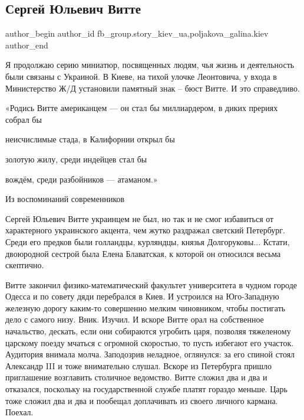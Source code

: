  
 
 
 
 
 
\subsection{Сергей Юльевич Витте}
\label{sec:22_12_2021.fb.fb_group.story_kiev_ua.3.vitte}
 
\ifcmt
 author_begin
   author_id fb_group.story_kiev_ua,poljakova_galina.kiev
 author_end
\fi

Я продолжаю серию миниатюр, посвященных людям, чья жизнь и деятельность были
связаны с Украиной. В Киеве, на тихой улочке Леонтовича, у входа в Министерство
Ж/Д установили памятный знак – бюст Витте. И это справедливо. 

\begin{zznagolos}
«Родись Витте американцем — он стал бы миллиардером, в диких прериях собрал бы 

неисчислимые стада, в Калифорнии открыл бы

золотую жилу, среди индейцев стал бы

вождём, среди разбойников — атаманом.»

Из воспоминаний современников
\end{zznagolos}

Сергей Юльевич Витте украинцем не был, но так и не смог избавиться от
характерного украинского акцента, чем жутко раздражал светский Петербург. Среди
его предков были голландцы, курляндцы, князья Долгоруковы... Кстати, двоюродной
сестрой была Елена Блаватская, к которой он относился весьма скептично. 


Витте закончил физико-математический факультет университета в чудном городе
Одесса и по совету дяди перебрался в Киев. И устроился на Юго-Западную железную
дорогу каким-то совершенно мелким чиновником, чтобы постигать дело с самого
низу. Вник. Изучил. И вскоре Витте орал на собственное начальство, дескать,
если они собираются угробить царя, позволяя тяжеленому царскому поезду мчаться
с огромной скоростью, то пусть избегают его участок. Аудитория внимала молча.
Заподозрив неладное, оглянулся: за его спиной стоял Александр III и тоже
внимательно слушал. Вскоре из Петербурга пришло приглашение возглавить
столичное ведомство. Витте сложил два и два и отказался, поскольку на
государственной службе платят гораздо меньше. Царь тоже сложил два и два и
пообещал доплачивать из своего личного кармана. Поехал. 

